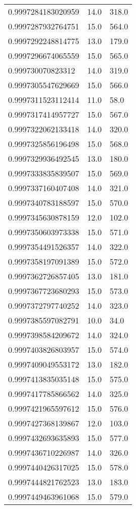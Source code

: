 \begin{center}
\begin{supertabular}[H]{p{0.30\textwidth}p{0.05\textwidth}p{0.05\textwidth}}
0.9997284183020959 & 14.0 & 318.0 \\ 
0.9997287932764751 & 15.0 & 564.0 \\ 
0.9997292248814775 & 13.0 & 179.0 \\ 
0.9997296674065559 & 15.0 & 565.0 \\ 
0.999730070823312 & 14.0 & 319.0 \\ 
0.9997305547629669 & 15.0 & 566.0 \\ 
0.9997311523112414 & 11.0 & 58.0 \\ 
0.9997317414957727 & 15.0 & 567.0 \\ 
0.9997322062133418 & 14.0 & 320.0 \\ 
0.9997325856196498 & 15.0 & 568.0 \\ 
0.9997329936492545 & 13.0 & 180.0 \\ 
0.9997333835839507 & 15.0 & 569.0 \\ 
0.9997337160407408 & 14.0 & 321.0 \\ 
0.9997340783188597 & 15.0 & 570.0 \\ 
0.9997345630878159 & 12.0 & 102.0 \\ 
0.9997350603973338 & 15.0 & 571.0 \\ 
0.9997354491526357 & 14.0 & 322.0 \\ 
0.9997358197091389 & 15.0 & 572.0 \\ 
0.9997362726857405 & 13.0 & 181.0 \\ 
0.9997367723680293 & 15.0 & 573.0 \\ 
0.9997372797740252 & 14.0 & 323.0 \\ 
0.9997385597082791 & 10.0 & 34.0 \\ 
0.9997398584209672 & 14.0 & 324.0 \\ 
0.9997403826803957 & 15.0 & 574.0 \\ 
0.9997409049553172 & 13.0 & 182.0 \\ 
0.9997413835035148 & 15.0 & 575.0 \\ 
0.9997417785866562 & 14.0 & 325.0 \\ 
0.9997421965597612 & 15.0 & 576.0 \\ 
0.9997427368139867 & 12.0 & 103.0 \\ 
0.9997432693635893 & 15.0 & 577.0 \\ 
0.9997436710226987 & 14.0 & 326.0 \\ 
0.9997440426317025 & 15.0 & 578.0 \\ 
0.9997444821762523 & 13.0 & 183.0 \\ 
0.9997449463961068 & 15.0 & 579.0 \\ 

\end{supertabular}
\end{center}
